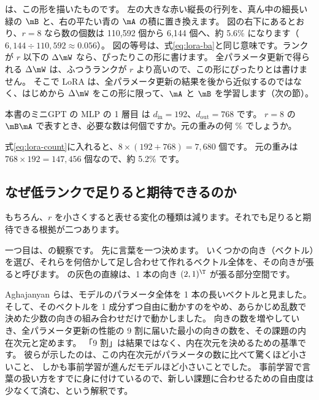 は、この形を描いたものです。
左の大きな赤い縦長の行列を、真ん中の細長い緑の $\mB$ と、右の平たい青の $\mA$ の積に置き換えます。
図の右下にあるとおり、$r=8$ なら数の個数は 110,592 個から 6,144 個へ、約 5.6\% になります（$6{,}144\div110{,}592\approx0.056$）。
図の等号は、式\eqref{eq:lora-ba}と同じ意味です。ランクが $r$ 以下の $\Delta\mW$ なら、ぴったりこの形に書けます。
全パラメータ更新で得られる $\Delta\mW$ は、ふつうランクが $r$ より高いので、この形にぴったりとは書けません。
そこで LoRA は、全パラメータ更新の結果を後から近似するのではなく、はじめから $\Delta\mW$ をこの形に限って、$\mA$ と $\mB$ を学習します（次の節）。

\begin{quiz}
本書のミニGPT の MLP の 1 層目  は $d_{\text{in}}=192$、$d_{\text{out}}=768$ です。
$r=8$ の $\mB\mA$ で表すとき、必要な数は何個ですか。元の重みの何 \% でしょうか。
\end{quiz}

式\eqref{eq:lora-count}に入れると、$8\times(192+768)=7{,}680$ 個です。
元の重みは $768\times192=147{,}456$ 個なので、約 5.2\% です。

\subsection{なぜ低ランクで足りると期待できるのか}\label{sec:lora-why-lowrank}

もちろん、$r$ を小さくすると表せる変化の種類は減ります。それでも足りると期待できる根拠が二つあります。

一つ目は、の観察です\cite{aghajanyan2021intrinsic}。
先に言葉を一つ決めます。
いくつかの向き（ベクトル）を選び、それらを何倍かして足し合わせて作れるベクトル全体を、その向きが張ると呼びます。
の灰色の直線は、1 本の向き $(2,1)^\T$ が張る部分空間です。

Aghajanyan らは、モデルのパラメータ全体を 1 本の長いベクトルと見ました。
そして、そのベクトルを 1 成分ずつ自由に動かすのをやめ、あらかじめ乱数で決めた少数の向きの組み合わせだけで動かしました。
向きの数を増やしていき、全パラメータ更新の性能の 9 割に届いた最小の向きの数を、その課題の内在次元と定めます。
「9 割」は結果ではなく、内在次元を決めるための基準です。
彼らが示したのは、この内在次元がパラメータの数に比べて驚くほど小さいこと、
しかも事前学習が進んだモデルほど小さいことでした。
事前学習で言葉の扱い方をすでに身に付けているので、新しい課題に合わせるための自由度は少なくて済む、という解釈です。

